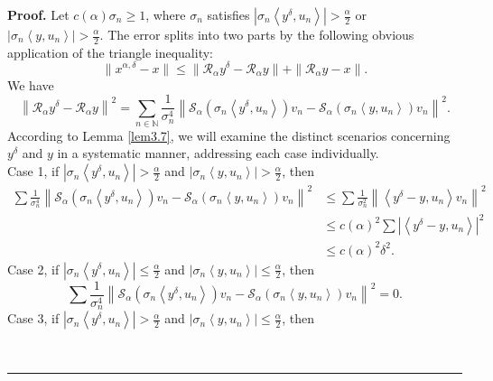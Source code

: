 \documentclass[a4paper,12pt]{article}
\numberwithin{equation}{section}
\newenvironment{proof}[1][Proof]{\textbf{#1.} }
{\ \rule{0.75em}{0.75em}\smallskip}
\begin{document}
\begin{proof}
    Let $c\left(\alpha\right)\sigma_{n}\geq 1$, where $\sigma_{n}$ satisfies $\left|\sigma_{n}\left<y^{\delta}, u_{n}\right>\right|>\frac{\alpha}{2}$ or $\left|\sigma_{n}\left<y, u_{n}\right>\right|>\frac{\alpha}{2}$. The error splits into two parts by the following obvious application of the triangle inequality:
    \begin{equation*}
        \|x^{\alpha,\delta}-x\|\leq\|\mathcal{R}_{\alpha}y^{\delta}-\mathcal{R}_{\alpha}y\| +\|\mathcal{R}_{\alpha}y-x\|.
    \end{equation*}
    We have
    \begin{equation*}
        \left\|\mathcal{R}_{\alpha}y^{\delta}-\mathcal{R}_{\alpha}y\right\|^{2}= \sum_{n\in\mathbb{N}}\frac{1}{\sigma_{n}^4}\left\|\mathcal{S}_{\alpha}(\sigma_{n}\left<y^{\delta},u_{n}\right>)v_{n} -\mathcal{S}_{\alpha}(\sigma_{n}\left<y,u_{n}\right>)v_{n}\right\|^{2}.
    \end{equation*}
    According to Lemma \ref{lem3.7}, we will examine the distinct scenarios concerning $y^{\delta}$ and $y$ in a systematic manner, addressing each case individually. \\
    Case 1, if $\left|\sigma_{n}\left<y^{\delta}, u_{n}\right>\right|>\frac{\alpha}{2}$ and $\left|\sigma_{n}\left<y, u_{n}\right>\right|>\frac{\alpha}{2}$, then
    \begin{align*}
        \sum\frac{1}{\sigma_{n}^4}\left\|\mathcal{S}_{\alpha}(\sigma_{n}\left<y^{\delta},u_{n}\right>)v_{n} -\mathcal{S}_{\alpha}(\sigma_{n}\left<y,u_{n}\right>)v_{n}\right\|^{2}
        & \leq \sum\frac{1}{\sigma_{n}^{2}}\left\|\left<y^{\delta}-y,u_{n}\right>v_{n} \right\|^{2} \nonumber\\
        & \leq c\left(\alpha\right)^{2}\sum\left|\left<y^{\delta}-y,u_{n}\right>\right|^{2} \\
        & \leq c\left(\alpha\right)^{2}\delta^{2}.
    \end{align*}
    Case 2, if $\left|\sigma_{n}\left<y^{\delta}, u_{n}\right>\right|\leq\frac{\alpha}{2}$ and $\left|\sigma_{n}\left<y, u_{n}\right>\right|\leq\frac{\alpha}{2}$, then
    \begin{equation*}
        \sum\frac{1}{\sigma_{n}^4}\left\|\mathcal{S}_{\alpha}(\sigma_{n}\left<y^{\delta},u_{n}\right>)v_{n} -\mathcal{S}_{\alpha}(\sigma_{n}\left<y,u_{n}\right>)v_{n}\right\|^{2}=0.
    \end{equation*}
    Case 3, if $\left|\sigma_{n}\left<y^{\delta}, u_{n}\right>\right|>\frac{\alpha}{2}$ and $\left|\sigma_{n}\left<y, u_{n}\right>\right|\leq\frac{\alpha}{2}$, then

\end{proof}
\end{document}
